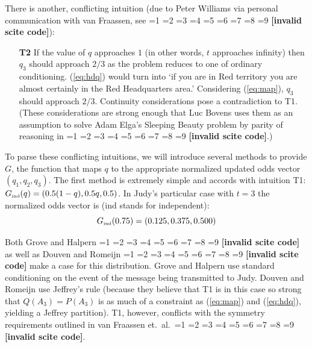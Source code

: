 \documentclass[smallextended]{svjour3}       %
\newcommand{\nial}{\noindent} %
\newcommand{\nonsc}[1]{}
\newcommand{\qnull}[1]{`#1'}
\newcommand{\PageP}{p.~}
\newcommand{\PageP}{}
\newcommand{\scite}[3]{\ifnum#1=1\cite{#2}\else
\ifnum#1=2\cite[{\PageP}~#3]{#2}\else
\ifnum#1=3\cite[{\PageP}~#3]{#2}\else
\ifnum#1=4\cite{#2}\else
\ifnum#1=5\cite{#2}\else
\ifnum#1=6\cite[{\PageP}~#3]{#2}\else
\ifnum#1=7\cite{#2}\else
\ifnum#1=8\cite[{\PageP}~#3]{#2}\else
\ifnum#1=9\cite[{\PageP}~#3]{#2}\else
\textbf{[invalid scite code]}\fi\fi\fi\fi\fi\fi\fi\fi\fi}
\begin{document}
\nial There is another, conflicting intuition (due to Peter Williams via
personal communication with van Fraassen, see
\scite{8}{fraassen81}{379})\nonsc{}:

\begin{enumerate}
\item[\textbf{T2}] If the value of $q$ approaches $1$ (in other words,
  $t$ approaches infinity) then $q_{3}$ should approach $2/3$ as the
  problem reduces to one of ordinary conditioning. ({\ref{eq:hdq}})
  would turn into \qnull{if you are in Red territory you are almost
    certainly in the Red Headquarters area.} Considering
  ({\ref{eq:map}}), $q_{3}$ should approach $2/3$. Continuity
  considerations pose a contradiction to T1. (These considerations are
  strong enough that Luc Bovens uses them as an assumption to solve
  Adam Elga's Sleeping Beauty problem by parity of reasoning in
  \scite{7}{bovens10}{}.)
\end{enumerate}

\nial To parse these conflicting intuitions, we will introduce several
methods to provide $G$, the function that maps $q$ to the appropriate
normalized updated odds vector $(q_{1},q_{2},q_{3})$. The first
method is extremely simple and accords with intuition T1:
$G_{\mbox{{\tiny ind}}}(q)=(0.5(1-q),0.5q,0.5)$. In Judy's particular
case with $t=3$ the normalized odds vector is (ind stands for
independent):
\begin{displaymath}
  G_{\mbox{{\tiny ind}}}(0.75)=(0.125,0.375,0.500)
\end{displaymath}

\nial Both Grove and Halpern \scite{1}{grovehalpern97}{} as well as
Douven and Romeijn \scite{1}{douvenromeijn09}{} make a case for this
distribution. Grove and Halpern use standard conditioning on the event
of the message being transmitted to Judy. Douven and Romeijn use
Jeffrey's rule (because they believe that T1 is in this case so strong
that $Q(A_{3})=P(A_{3})$ is as much of a constraint as (\ref{eq:map})
and (\ref{eq:hdq}), yielding a Jeffrey partition). T1, however,
conflicts with the symmetry requirements outlined in van Fraassen et.\
al.\ \scite{1}{fraassenetal86}{}.
\end{document}
